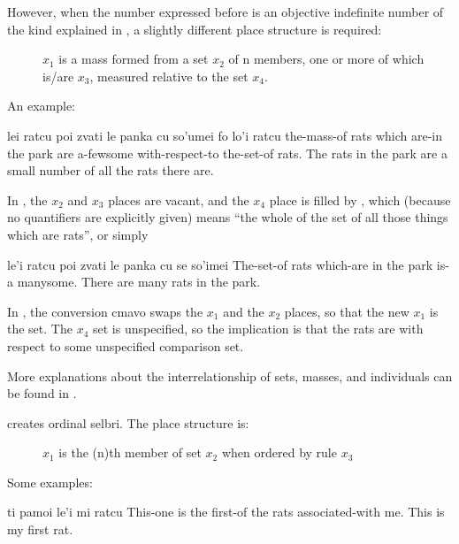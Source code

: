 However, when the number expressed before  is an
    objective indefinite number of the kind explained in , a slightly different place structure
    is required:
\begin{description}
\item[] $x_1$ is a mass formed from a set $x_2$ of n members, one or more of which is/are $x_3$, measured relative to the set $x_4$.

\end{description}

An example:
\begin{example}
lei ratcu poi zvati le panka cu so'umei\n
\T	fo lo'i ratcu\n
the-mass-of rats which are-in the park are a-fewsome\n
\T	with-respect-to the-set-of rats.\n
The rats in the park are a small number\n
\T	of all the rats there are.
\end{example}

In , the $x_2$ and $x_3$ places are
    vacant, and the $x_4$ place is filled by , which
    (because no quantifiers are explicitly given) means ``the whole
    of the set of all those things which are rats'', or simply
\begin{example}
le'i ratcu poi zvati le panka cu se so'imei\n
The-set-of rats which-are in the park is-a manysome.\n
There are many rats in the park.
\end{example}

In , the conversion cmavo
     swaps the $x_1$ and the $x_2$ places, so that the new $x_1$ is
    the set. The $x_4$ set is unspecified, so the implication is that
    the rats are  with respect to some unspecified
    comparison set.

More explanations about the interrelationship of sets,
    masses, and individuals can be found in .

 creates ordinal selbri. The place structure is:
\begin{description}
\item[] $x_1$ is the (n)th member of set $x_2$ when ordered by rule $x_3$

\end{description}

Some examples:
\begin{example}
ti pamoi le'i mi ratcu\n
This-one is the first-of the rats associated-with me.\n
This is my first rat.
\end{example}

